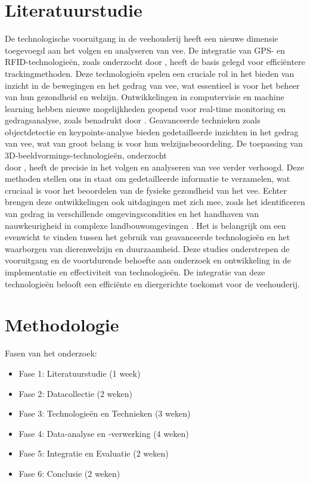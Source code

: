 \section{Literatuurstudie}%
\label{sec:state-of-the-art}
De technologische vooruitgang in de veehouderij heeft een nieuwe dimensie toegevoegd aan het volgen en analyseren van vee. 
De integratie van GPS- en RFID-technologieën, zoals onderzocht door \autocite{Nääs2013}\autocite{Akhigbe2021}, heeft de basis gelegd voor efficiëntere trackingmethoden. 
Deze technologieën spelen een cruciale rol in het bieden van inzicht in de bewegingen en het gedrag van vee, wat essentieel is voor het beheer van hun gezondheid en welzijn.
Ontwikkelingen in computervisie en machine learning hebben nieuwe mogelijkheden geopend voor real-time monitoring en gedragsanalyse, zoals benadrukt door \autocite{Kleanthous2018}. 
Geavanceerde technieken zoals objectdetectie en keypoints-analyse bieden gedetailleerde inzichten in het gedrag van vee, wat van groot belang is voor hun welzijnsbeoordeling. 
De toepassing van 3D-beeldvormings-technologieën, onderzocht \\door \autocite{LeCozler2019}, heeft de precisie in het volgen en analyseren van vee verder verhoogd.
Deze methoden stellen ons in staat om gedetailleerde informatie te verzamelen, wat cruciaal is voor het beoordelen van de fysieke gezondheid van het vee.
Echter brengen deze ontwikkelingen ook uitdagingen met zich mee, zoals het identificeren van gedrag in verschillende omgevingscondities en het handhaven van nauwkeurigheid in complexe landbouwomgevingen \autocite{Narayan2023}\autocite{Busse2015}. 
Het is belangrijk om een evenwicht te vinden tussen het gebruik van geavanceerde technologieën en het waarborgen van dierenwelzijn en duurzaamheid.
Deze studies onderstrepen de vooruitgang en de voortdurende behoefte aan onderzoek en ontwikkeling in de implementatie en effectiviteit van technologieën. 
De integratie van deze technologieën belooft een efficiënte en diergerichte toekomst voor de veehouderij.
\section{Methodologie}%
\label{sec:methodologie}
Fasen van het onderzoek:
\begin{itemize}
  \item Fase 1: Literatuurstudie (1 week)
  \item Fase 2: Datacollectie (2 weken)
  \item Fase 3: Technologieën en Technieken (3 weken)
  \item Fase 4: Data-analyse en -verwerking (4 weken)
  \item Fase 5: Integratie en Evaluatie (2 weken)
  \item Fase 6: Conclusie (2 weken)
\end{itemize}
